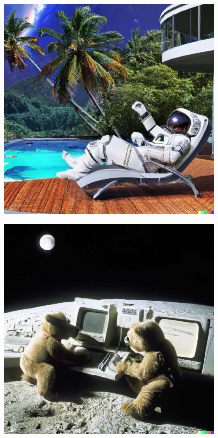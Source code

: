 \documentclass[a4paper]{article}
\begin{document}
\begin{figure}[h!]
\begin{center}
\includegraphics[scale=0.75]{astronaut.jpg}
\end{center}
\label{fig:astronaut}
\end{figure}

\begin{figure}[h!]
\begin{center}
\includegraphics[scale=0.75]{medvedi.jpg}
\end{center}
\label{fig:medvedi}
\end{figure}
\end{document}
